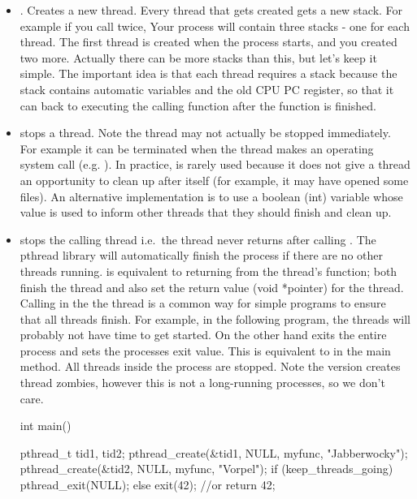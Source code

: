 \begin{itemize}
\item {}. Creates a new thread. Every thread that gets created gets a new stack. For example if you call  twice, Your process will contain three stacks - one for each thread. The first thread is created when the process starts, and you created two more. Actually there can be more stacks than this, but let's keep it simple. The important idea is that each thread requires a stack because the stack contains automatic variables and the old CPU PC register, so that it can back to executing the calling function after the function is finished.
\item {} stops a thread. Note the thread may not actually be stopped immediately. For example it can be terminated when the thread makes an operating system call (e.g. ). In practice,  is rarely used because it does not give a thread an opportunity to clean up after itself (for example, it may have opened some files). An alternative implementation is to use a boolean (int) variable whose value is used to inform other threads that they should finish and clean up.
\item {} stops the calling thread i.e.~the thread never returns after calling . The pthread library will automatically finish the process if there are no other threads running.  is equivalent to returning from the thread's function; both finish the thread and also set the return value (void *pointer) for the thread. Calling  in the the  thread is a common way for simple programs to ensure that all threads finish. For example, in the following program, the  threads will probably not have time to get started. On the other hand  exits the entire process and sets the processes exit value. This is equivalent to  in the main method. All threads inside the process are stopped. Note the  version creates thread zombies, however this is not a long-running processes, so we don't care. 

\begin{code}[language=C]
int main() {
  pthread_t tid1, tid2;
  pthread_create(&tid1, NULL, myfunc, "Jabberwocky");
  pthread_create(&tid2, NULL, myfunc, "Vorpel");
  if (keep_threads_going) {
    pthread_exit(NULL); 
  } else {
    exit(42); //or return 42;
  }

}
\end{code}
\end{itemize}
